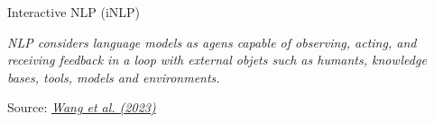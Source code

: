 \endlecture






























\begin{vbframe}{Interactive NLP (\MakeLowercase{i}NLP)}

\vfill

\emph{NLP considers language models as agens capable of observing, acting, and receiving feedback in a loop with external objets such as humants, knowledge bases, tools, models and environments.} \vskip2mm

\footnotesize{Source:} \href{https://arxiv.org/pdf/2305.13246.pdf}{\footnotesize \it Wang et al. (2023)}

\vfill

\end{vbframe}


